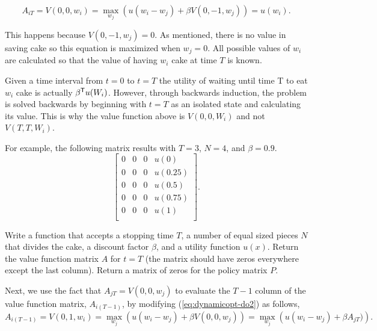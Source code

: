 \begin{equation}\label{eq:dynamicopt-do2}
A_{iT} = V(0, 0, w_{i}) = \max_{w_{j}} \left(u(w_{i} - w_{j}) + \beta V(0, -1, w_{j})\right) = u(w_{i}).
\end{equation}

This happens because $V(0,-1,w_j) = 0$.
As mentioned, there is no value in saving cake so this equation is maximized when $w_j = 0$.
All possible values of $w_{i}$ are calculated so that the value of having $w_i$ cake at time $T$ is known.

\begin{warn}
Given a time interval from $t=0$ to $t=T$ the utility of waiting until time T to eat $w_i$ cake is actually $\beta^{\mathsf T} u(W_{i})$.
However, through backwards induction, the problem is solved backwards by beginning with $t=T$ as an isolated state and calculating its value.
This is why the value function above is $V(0, 0, W_i)$ and not $V(T, T, W_i)$.
\end{warn}

For example, the following matrix results with $T=3$, $N=4$, and $\beta=0.9$.
\[
\begin{bmatrix}
0 & 0 & 0 & u(0) \\
0 & 0 & 0 & u(0.25) \\
0 & 0 & 0 & u(0.5) \\
0 & 0 & 0 & u(0.75) \\
0 & 0 & 0 & u(1) \\
\end{bmatrix}.
\]


\begin{problem}
Write a function that accepts a stopping time $T$, a number of equal sized pieces $N$ that divides the cake, a discount factor $\beta$, and a utility function $u(x)$.
Return the value function matrix $A$ for $t=T$ (the matrix should have zeros everywhere except the last column).
Return a matrix of zeros for the policy matrix $P$.
\label{prob:dynamicopt-eat-cake}
\end{problem}

Next, we use the fact that $A_{jT} = V(0,0,w_j)$ to evaluate the $T-1$ column of the value function matrix, $A_{i(T-1)}$, by modifying  (\ref{eq:dynamicopt-do2}) as follows,
\begin{equation}\label{eq:dynamicopt-do3}
A_{i(T-1)} = V(0, 1, w_{i}) = \max_{w_j}\left(u(w_{i} - w_{j}) + \beta V(0,0,w_{j})\right) = \max_{w_j}\left(u(w_{i} - w_{j}) + \beta A_{jT})\right).
\end{equation}

